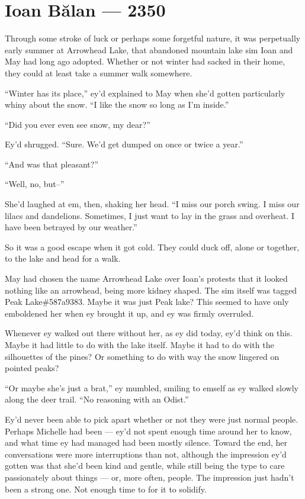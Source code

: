 \hypertarget{ioan-bux103lan-2350}{%
\chapter{Ioan Bălan — 2350}\label{ioan-bux103lan-2350}}

Through some stroke of luck or perhaps some forgetful nature, it was perpetually early summer at Arrowhead Lake, that abandoned mountain lake sim Ioan and May had long ago adopted. Whether or not winter had sacked in their home, they could at least take a summer walk somewhere.

``Winter has its place,'' ey'd explained to May when she'd gotten particularly whiny about the snow. ``I like the snow so long as I'm inside.''

``Did you ever even see snow, my dear?''

Ey'd shrugged. ``Sure. We'd get dumped on once or twice a year.''

``And was that pleasant?''

``Well, no, but--''

She'd laughed at em, then, shaking her head. ``I miss our porch swing. I miss our lilacs and dandelions. Sometimes, I just want to lay in the grass and overheat. I have been betrayed by our weather.''

So it was a good escape when it got cold. They could duck off, alone or together, to the lake and head for a walk.

May had chosen the name Arrowhead Lake over Ioan's protests that it looked nothing like an arrowhead, being more kidney shaped. The sim itself was tagged Peak Lake\#587a9383. Maybe it was just Peak lake? This seemed to have only emboldened her when ey brought it up, and ey was firmly overruled.

Whenever ey walked out there without her, as ey did today, ey'd think on this. Maybe it had little to do with the lake itself. Maybe it had to do with the silhouettes of the pines? Or something to do with way the snow lingered on pointed peaks?

``Or maybe she's just a brat,'' ey mumbled, smiling to emself as ey walked slowly along the deer trail. ``No reasoning with an Odist.''

Ey'd never been able to pick apart whether or not they were just normal people. Perhaps Michelle had been — ey'd not spent enough time around her to know, and what time ey had managed had been mostly silence. Toward the end, her conversations were more interruptions than not, although the impression ey'd gotten was that she'd been kind and gentle, while still being the type to care passionately about things — or, more often, people. The impression just hadn't been a strong one. Not enough time to for it to solidify.

